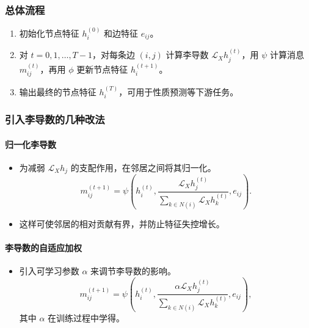 \subsubsection{总体流程}
\begin{enumerate}
  \item 初始化节点特征 $h_i^{(0)}$ 和边特征 $e_{ij}$。
  \item 对 $t=0,1,\ldots,T-1$，对每条边 $(i,j)$ 计算李导数 $\mathcal L_X h_j^{(t)}$，用 $\psi$ 计算消息 $m_{ij}^{(t)}$，再用 $\phi$ 更新节点特征 $h_i^{(t+1)}$。
  \item 输出最终的节点特征 $h_i^{(T)}$，可用于性质预测等下游任务。
\end{enumerate}

\subsubsection{引入李导数的几种改法}
\paragraph{归一化李导数}
\begin{itemize}
  \item 为减弱 $\mathcal L_X h_j$ 的支配作用，在邻居之间将其归一化。
  \[
    m_{ij}^{(t+1)}=\psi\!\left(h_i^{(t)},
         \frac{\mathcal L_X h_j^{(t)}}{\displaystyle\sum_{k\in N(i)}\mathcal L_X h_k^{(t)}},
         e_{ij}\right).
  \]
  \item 这样可使邻居的相对贡献有界，并防止特征失控增长。
\end{itemize}

\paragraph{李导数的自适应加权}
\begin{itemize}
  \item 引入可学习参数 $\alpha$ 来调节李导数的影响。
  \[
    m_{ij}^{(t+1)}=\psi\!\left(h_i^{(t)},
         \frac{\alpha\mathcal L_X h_j^{(t)}}{\displaystyle\sum_{k\in N(i)}\mathcal L_X h_k^{(t)}},
         e_{ij}\right),
  \]
  其中 $\alpha$ 在训练过程中学得。
\end{itemize}

